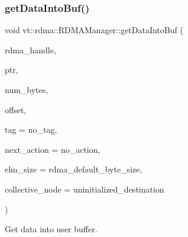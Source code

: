 \subsubsection{\texorpdfstring{get\+Data\+Into\+Buf()}{getDataIntoBuf()}}
{\footnotesize\ttfamily void vt\+::rdma\+::\+R\+D\+M\+A\+Manager\+::get\+Data\+Into\+Buf (\begin{DoxyParamCaption}\item[{\hyperlink{namespacevt_a10442579ec4e7ebef223818e64bcf908}{R\+D\+M\+A\+\_\+\+Handle\+Type} const \&}]{rdma\+\_\+handle,  }\item[{\hyperlink{namespacevt_aab05b4a584f7ee835a6d0f66915cf59b}{R\+D\+M\+A\+\_\+\+Ptr\+Type} const \&}]{ptr,  }\item[{\hyperlink{namespacevt_aab8d55968084610ce3b17057981e9300}{Byte\+Type} const \&}]{num\+\_\+bytes,  }\item[{\hyperlink{namespacevt_aab8d55968084610ce3b17057981e9300}{Byte\+Type} const \&}]{offset,  }\item[{\hyperlink{namespacevt_a84ab281dae04a52a4b243d6bf62d0e52}{Tag\+Type} const \&}]{tag = {\ttfamily no\+\_\+tag},  }\item[{\hyperlink{namespacevt_ae0a5a7b18cc99d7b732cb4d44f46b0f3}{Action\+Type}}]{next\+\_\+action = {\ttfamily no\+\_\+action},  }\item[{\hyperlink{namespacevt_aab8d55968084610ce3b17057981e9300}{Byte\+Type} const \&}]{elm\+\_\+size = {\ttfamily rdma\+\_\+default\+\_\+byte\+\_\+size},  }\item[{\hyperlink{namespacevt_a866da9d0efc19c0a1ce79e9e492f47e2}{Node\+Type} const \&}]{collective\+\_\+node = {\ttfamily uninitialized\+\_\+destination} }\end{DoxyParamCaption})}



Get data into user buffer. 


